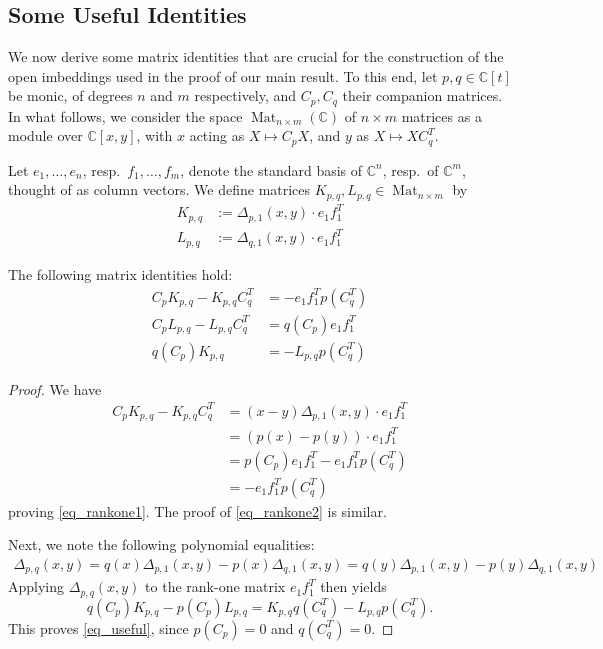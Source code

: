 \documentclass[11pt]{article}
\theoremstyle{definition}
\theoremstyle{plain}
\theoremstyle{remark}
\newcommand{\numberset}{\mathbb}
\newcommand{\C}{\numberset{C}}
\DeclareMathOperator{\Mat}{Mat}
\begin{document}
        \subsection{Some Useful Identities}

        We now derive some matrix identities that are crucial for the construction of the open imbeddings used in the proof of our main result. To this end, let $p,q \in \C[t]$ be monic, of degrees $n$ and $m$ respectively, and $C_p, C_q$ their companion matrices. In what follows, we consider the space $\Mat_{n \times m}(\C)$ of $n \times m$ matrices as a module over $\C[x,y]$, with $x$ acting as $X \mapsto C_pX$, and $y$ as $X \mapsto XC_q^T$.
        
        Let $e_1,\dots,e_n$, resp.\ $f_1,\dots,f_m$, denote the standard basis of $\C^n$, resp.\ of $\C^m$, thought of as column vectors. We define matrices $K_{p,q}, L_{p,q} \in \Mat_{n\times m}$ by
        \begin{align*}
            K_{p,q} &:= \Delta_{p,1}(x,y) \cdot e_1f_1^T \\
            L_{p,q} &:= \Delta_{q,1}(x,y) \cdot e_1f_1^T
        \end{align*}
        
        \begin{lemma}\label{lemma-bezouttriangles}
            The following matrix identities hold:
            \begin{align}
                C_pK_{p,q}-K_{p,q}C_q^T &= -e_1f_1^Tp(C_q^T)  \label{eq_rankone1} \\
                C_pL_{p,q} - L_{p,q}C_q^T &= q(C_p)e_1f_1^T  \label{eq_rankone2} \\
                q(C_p)K_{p,q} &= -L_{p,q}p(C_q^T) \label{eq_useful}
            \end{align}
        \end{lemma}
        \begin{proof}
            We have
            \begin{align*}
                C_pK_{p,q}-K_{p,q}C_q^T &= (x-y)\Delta_{p,1}(x,y) \cdot e_1f_1^T \\
                &= (p(x)-p(y)) \cdot e_1f_1^T \\
                &= p(C_p)e_1f_1^T-e_1f_1^Tp(C_q^T) \\
                &= - e_1f_1^Tp(C_q^T)
            \end{align*}
            proving \eqref{eq_rankone1}. The proof of \eqref{eq_rankone2} is similar.

            Next, we note the following polynomial equalities:
            \begin{align*}
                \Delta_{p,q}(x,y) = q(x)\Delta_{p,1}(x,y)-p(x)\Delta_{q,1}(x,y) = q(y)\Delta_{p,1}(x,y)-p(y)\Delta_{q,1}(x,y)
            \end{align*}
            Applying $\Delta_{p,q}(x,y)$ to the rank-one matrix $e_1f_1^T$ then yields
            \[
                q(C_p)K_{p,q}-p(C_p)L_{p,q} = K_{p,q}q(C_q^T)-L_{p,q}p(C_q^T).
            \]
            This proves \eqref{eq_useful}, since $p(C_p) = 0$ and $q(C_q^T) = 0$.
        \end{proof}
\end{document}
